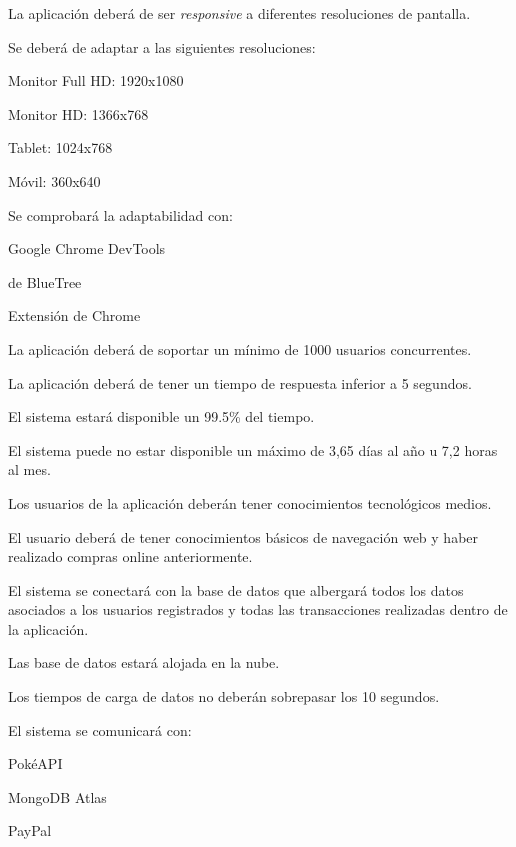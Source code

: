 \begin{RNF}
	\item La aplicación deberá de ser \textit{responsive} a diferentes resoluciones de pantalla.
	\begin{RNF}
		\item Se deberá de adaptar a las siguientes resoluciones:
		\begin{RNF}
			\item Monitor Full HD: 1920x1080
			\item Monitor HD: 1366x768
			\item Tablet: 1024x768
			\item Móvil: 360x640
		\end{RNF}
		\item Se comprobará la adaptabilidad con:
		\begin{RNF}
			\item Google Chrome DevTools
			\item {} de BlueTree
			\item Extensión de Chrome 
		\end{RNF}
	\end{RNF}

	\item La aplicación deberá de soportar un mínimo de 1000 usuarios concurrentes.
	\item La aplicación deberá de tener un tiempo de respuesta inferior a 5 segundos.
	
	\item El sistema estará disponible un 99.5\% del tiempo.
	\begin{RNF}
		\item El sistema puede no estar disponible un máximo de 3,65 días al año u 7,2 horas al mes.
	\end{RNF}

	\item Los usuarios de la aplicación deberán tener conocimientos tecnológicos medios.
	\begin{RNF}
		\item El usuario deberá de tener conocimientos básicos de navegación web y haber realizado compras online anteriormente.
	\end{RNF}
	
	\item El sistema se conectará con la base de datos que albergará todos los datos asociados a los usuarios registrados y todas las transacciones realizadas dentro de la aplicación.
	\begin{RNF}
		\item Las base de datos estará alojada en la nube.
		\item Los tiempos de carga de datos no deberán sobrepasar los 10 segundos.
	\end{RNF}

	\item El sistema se comunicará con:
	\begin{RNF}
		\item PokéAPI
		\item MongoDB Atlas
		\item PayPal
	\end{RNF}
\end{RNF}